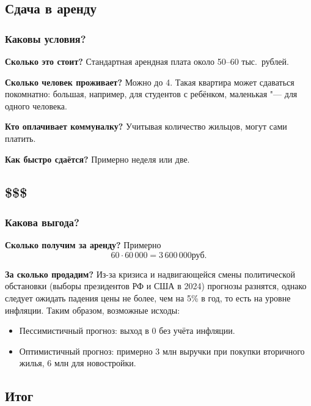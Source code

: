 \documentclass{beamer}
\begin{document}
	\subsection{Сдача в аренду}
		
		\begin{frame}
			\frametitle{Каковы условия?}
		
			\textbf{Сколько это стоит?} Стандартная арендная плата около 50--60 тыс.\ рублей.
			
			\textbf{Сколько человек проживает?} Можно до 4.
			Такая квартира может сдаваться покомнатно: большая, например, для студентов с ребёнком, маленькая "--- для одного человека.
			
			\textbf{Кто оплачивает коммуналку?} Учитывая количество жильцов, могут сами платить.
			
			\textbf{Как быстро сдаётся?} Примерно неделя или две.
		
		\end{frame}
		
	\subsection{\$\$\$}
	
		\begin{frame}
			\frametitle{Какова выгода?}
		
			\textbf{Сколько получим за аренду?} Примерно
			\[
				60\cdot60\,000 = 3\,600\,000 \text{руб.}
			\]
			
			\textbf{За сколько продадим?} Из-за кризиса и надвигающейся смены политической обстановки (выборы президентов РФ и США в 2024) прогнозы разнятся, однако следует ожидать падения цены не более, чем на 5\% в год, то есть на уровне инфляции.
			Таким образом, возможные исходы:
			\begin{itemize}
				\item Пессимистичный прогноз: выход в 0 без учёта инфляции.
				\item Оптимистичный прогноз: примерно 3 млн выручки при покупки вторичного жилья, 6 млн для новостройки.
			\end{itemize}
			
		
		\end{frame}

	\subsection{Итог}
	
\end{document}
